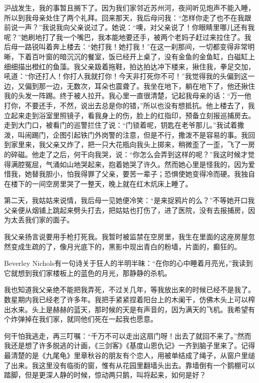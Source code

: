 \par 沪战发生，我的事暂且搁下了。因为我们家邻近苏州河，夜间听见炮声不能入睡，所以到我母亲处住了两个礼拜。回来那天，我后母问我：“怎样你走了也不在我跟前说一声？”我说我向父亲说过了。她说：“噢，对父亲说了！你眼睛里哪儿还有我呢？”她刷地打了我一个嘴巴，我本能地要还手，被两个老妈子赶过来拉住了。我后母一路锐叫着奔上楼去：“她打我！她打我！”在这一刹那间，一切都变得非常明晰，下着百叶窗的暗沉沉的餐室，饭已经开上桌了，没有金鱼的金鱼缸，白磁缸上细细描出橙红的鱼藻。我父亲趿着拖鞋，拍达拍达冲下楼来，揪住我，拳足交加，吼道：“你还打人！你打人我就打你！今天非打死你不可！”我觉得我的头偏到这一边，又偏到那一边，无数次，耳朵也震聋了。我坐在地下，躺在地下了，他还揪住我的头发一阵踢。终于被人拉开。我心里一直很清楚，记起我母亲的话：“万一他打你，不要还手，不然，说出去总是你的错，”所以也没有想抵抗。他上楼去了，我立起来走到浴室里照镜子，看我身上的伤，脸上的红指印，预备立刻报巡捕房去。走到大门口，被看门的巡警拦住了说：“门锁着呢，钥匙在老爷那儿。”我试着撒泼，叫闹踢门，企图引起铁门外岗警的注意，但是不行，撒泼不是容易的事。我回到家里来，我父亲又炸了，把一只大花瓶向我头上掷来，稍微歪了一歪，飞了一房的碎磁。他走了之后，何干向我哭，说：“你怎么会弄到这样的呢？”我这时候才觉得满腔冤屈，气涌如山地哭起来，抱着她哭了许久。然而她心里是怪我的，因为爱惜我，她替我胆小，怕我得罪了父亲，要苦一辈子；恐惧使她变得冷而硬。我独自在楼下的一间空房里哭了一整天，晚上就在红木炕床上睡了。
\par 第二天，我姑姑来说情，我后母一见她便冷笑：“是来捉鸦片的么？”不等她开口我父亲便从烟铺上跳起来劈头打去，把姑姑也打伤了，进了医院，没有去报捕房，因为太丢我们家的面子。
\par 我父亲扬言说要用手枪打死我。我暂时被监禁在空房里，我生在里面的这座房屋忽然变成生疏的了，像月光底下的，黑影中现出青白的粉墙，片面的，癫狂的。
\par Beverley Nichols有一句诗关于狂人的半明半昧：“在你的心中睡着月亮光，”我读到它就想到我们家楼板上的蓝色的月光，那静静的杀机。
\par 我也知道我父亲绝不能把我弄死，不过关几年，等我放出来的时候已经不是我了。数星期内我已经老了许多年。我把手紧紧捏着阳台上的木阑干，仿佛木头上可以榨出水来。头上是赫赫的蓝天，那时候的天是有声音的，因为满天的飞机。我希望有个炸弹掉在我们家，就同他们死在一起我也愿意。
\par 何干怕我逃走，再三叮嘱：“千万不可以走出这扇门呀！出去了就回不来了。”然而我还是想了许多脱逃的计画，《三剑客》《基度山恩仇记》一齐到脑子里来了。记得最清楚的是《九尾龟》里章秋谷的朋友有个恋人，用被单结成了绳子，从窗户里缒了出来。我这里没有临街的窗，惟有从花园里翻墙头出去。靠墙倒有一个鹅棚可以踏脚，但是更深人静的时候，惊动两只鹅，叫将起来，如何是好？

